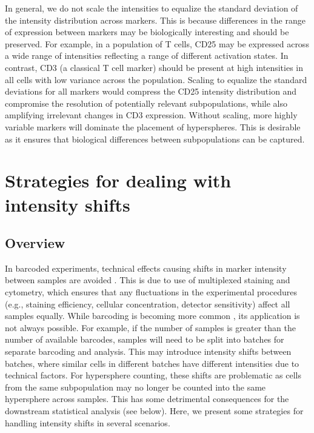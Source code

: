 \documentclass{article}
\begin{document}
In general, we do not scale the intensities to equalize the standard deviation of the intensity distribution across markers.
This is because differences in the range of expression between markers may be biologically interesting and should be preserved.
For example, in a population of T cells, CD25 may be expressed across a wide range of intensities reflecting a range of different activation states.
In contrast, CD3 (a classical T cell marker) should be present at high intensities in all cells with low variance across the population.
Scaling to equalize the standard deviations for all markers would compress the CD25 intensity distribution and compromise the resolution of potentially relevant subpopulations, while also amplifying irrelevant changes in CD3 expression.
Without scaling, more highly variable markers will dominate the placement of hyperspheres.
This is desirable as it ensures that biological differences between subpopulations can be captured. 

\section{Strategies for dealing with intensity shifts}

\subsection{Overview}
In barcoded experiments, technical effects causing shifts in marker intensity between samples are avoided \cite{zunder2015palladium}.
This is due to use of multiplexed staining and cytometry, which ensures that any fluctuations in the experimental procedures (e.g., staining efficiency, cellular concentration, detector sensitivity) affect all samples equally.
While barcoding is becoming more common \cite{gaudilliere2014delayed,gaudilliere2015implementing}, its application is not always possible.
For example, if the number of samples is greater than the number of available barcodes, samples will need to be split into batches for separate barcoding and analysis.
This may introduce intensity shifts between batches, where similar cells in different batches have different intensities due to technical factors.
For hypersphere counting, these shifts are problematic as cells from the same subpopulation may no longer be counted into the same hypersphere across samples.
This has some detrimental consequences for the downstream statistical analysis (see below).
Here, we present some strategies for handling intensity shifts in several scenarios.
\end{document}
